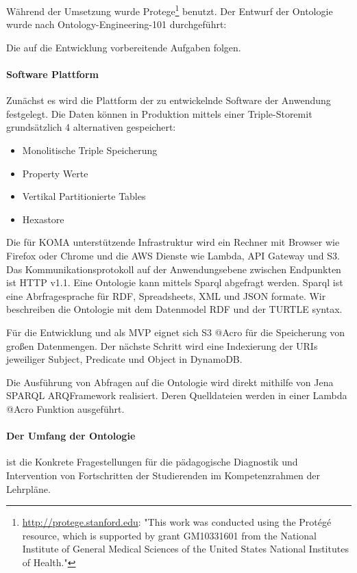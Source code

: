 \documentclass[
12pt,
english,
ngerman,
headsepline,
twoside,
openright,
numbers=noenddot,version=first
]{scrreprt}
\begin{document}
Während der Umsetzung wurde Protege\footnote{\url{http://protege.stanford.edu}: "This work was conducted using the Protégé resource, which is supported by grant GM10331601 from the National Institute of General Medical Sciences of the United States National Institutes of Health."} benutzt.
Der Entwurf der Ontologie wurde nach Ontology-Engineering-101 durchgeführt:

Die auf die Entwicklung vorbereitende Aufgaben folgen.

\paragraph{Software Plattform} Zunächst es wird die Plattform der zu entwickelnde Software der Anwendung festgelegt.
Die Daten können in Produktion mittels einer \glqq Triple-Store\grqq mit grundsätzlich 4 alternativen gespeichert:
\begin{itemize}
	\item Monolitische Triple Speicherung
	\item Property Werte
	\item Vertikal Partitionierte Tables
	\item Hexastore
\end{itemize}

Die für KOMA unterstützende Infrastruktur wird ein Rechner mit Browser wie Firefox oder Chrome und die AWS Dienste wie Lambda, API Gateway und S3. Das Kommunikationsprotokoll auf der Anwendungsebene zwischen Endpunkten ist HTTP v1.1.
Eine Ontologie kann mittels Sparql abgefragt werden. Sparql ist eine Abrfragesprache für RDF, Spreadsheets, XML und JSON formate\cite{SparqlLearn}. Wir beschreiben die Ontologie mit dem Datenmodel RDF und der TURTLE syntax.

Für die Entwicklung und als MVP eignet sich S3 @Acro für die Speicherung von großen Datenmengen. Der nächste Schritt wird eine Indexierung der URIs jeweiliger Subject, Predicate und Object in DynamoDB. 

Die Ausführung von Abfragen auf die Ontologie wird direkt mithilfe von \glqq Jena SPARQL ARQ\grqq Framework realisiert. Deren Quelldateien werden in einer Lambda @Acro Funktion ausgeführt.

\paragraph{Der Umfang der Ontologie} ist die Konkrete Fragestellungen für die pädagogische Diagnostik und Intervention von Fortschritten der Studierenden im Kompetenzrahmen der Lehrpläne.
\end{document}
